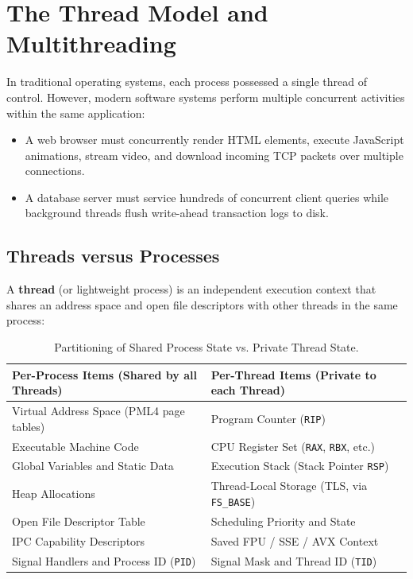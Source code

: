 \section{The Thread Model and Multithreading}
\label{sec:thread_model}

In traditional operating systems, each process possessed a single thread of control. However, modern software systems perform multiple concurrent activities within the same application:
\begin{itemize}
    \item A web browser must concurrently render HTML elements, execute JavaScript animations, stream video, and download incoming TCP packets over multiple connections.
    \item A database server must service hundreds of concurrent client queries while background threads flush write-ahead transaction logs to disk.
\end{itemize}

\subsection{Threads versus Processes}
A \textbf{thread} (or lightweight process) is an independent execution context that shares an address space and open file descriptors with other threads in the same process:

\begin{table}[htbp]
\centering
\small
\begin{tabular}{ll}
\hline
\textbf{Per-Process Items (Shared by all Threads)} & \textbf{Per-Thread Items (Private to each Thread)} \\
\hline
Virtual Address Space (PML4 page tables) & Program Counter (\texttt{RIP}) \\
Executable Machine Code & CPU Register Set (\texttt{RAX}, \texttt{RBX}, etc.) \\
Global Variables and Static Data & Execution Stack (Stack Pointer \texttt{RSP}) \\
Heap Allocations & Thread-Local Storage (TLS, via \texttt{FS\_BASE}) \\
Open File Descriptor Table & Scheduling Priority and State \\
IPC Capability Descriptors & Saved FPU / SSE / AVX Context \\
Signal Handlers and Process ID (\texttt{PID}) & Signal Mask and Thread ID (\texttt{TID}) \\
\hline
\end{tabular}
\caption{Partitioning of Shared Process State vs. Private Thread State.}
\label{tab:thread_state}
\end{table}

